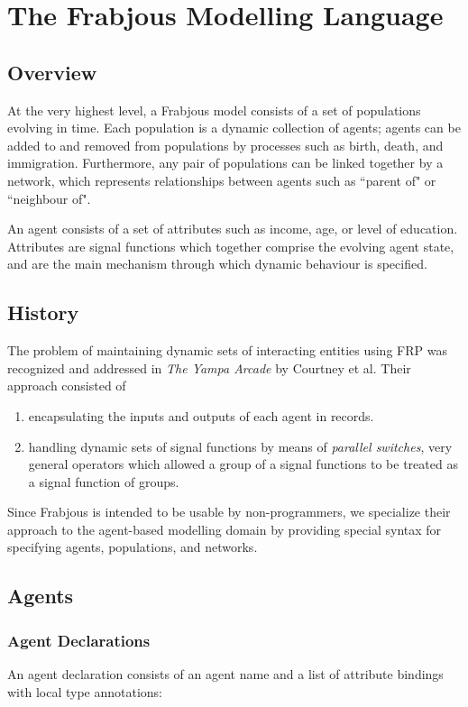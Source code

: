 \documentclass{article}
\begin{document}
\section{The Frabjous Modelling Language}
\subsection{Overview}
At the very highest level, a Frabjous model consists of a set of populations evolving in time. Each population is a dynamic collection of agents; agents can be added to and removed from populations by processes such as birth, death, and immigration. Furthermore, any pair of populations can be linked together by a network, which represents relationships between agents such as ``parent of" or ``neighbour of".

An agent consists of a set of attributes such as income, age, or level of education. Attributes are signal functions which together comprise the evolving agent state, and are the main mechanism through which dynamic behaviour is specified. 

\subsection{History}
The problem of maintaining dynamic sets of interacting entities using FRP was recognized and addressed in \emph{The Yampa Arcade} by Courtney et al. Their approach consisted of

\begin{enumerate}
\item encapsulating the inputs and outputs of each agent in records.
\item handling dynamic sets of signal functions by means of \emph{parallel switches}, very general operators which allowed a group of a signal functions to be treated as a signal function of groups. 
\end{enumerate}

Since Frabjous is intended to be usable by non-programmers, we specialize their approach to the agent-based modelling domain by providing special syntax for specifying agents, populations, and networks. 

\subsection{Agents}
\subsubsection{Agent Declarations}
An agent declaration consists of an agent name and a list of attribute bindings with local type annotations: 
\end{document}
